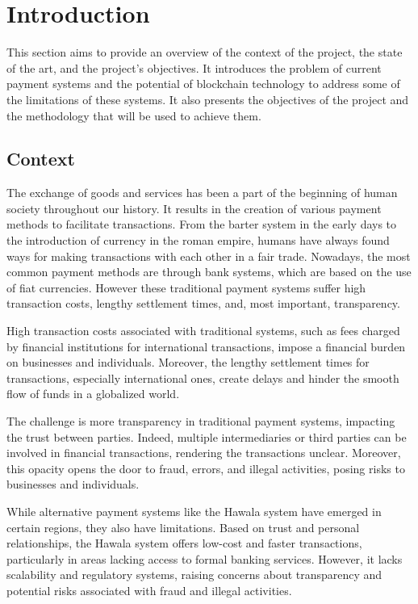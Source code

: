\chapter{Introduction}
\label{ch:introduction}

This section aims to provide an overview of the context of the project, the state of the art, and the project's objectives. It introduces the
problem of current payment systems and the potential of blockchain technology to address some of the limitations of these systems. It also presents the
objectives of the project and the methodology that will be used to achieve them.


\minitoc



\section{Context}
\label{sec:ch1_context}

The exchange of goods and services has been a part of the beginning of human society throughout our history. It results in the creation of various payment methods
to facilitate transactions. From the barter system in the early days to the introduction of currency in the roman empire, humans
have always found ways for making transactions with each other in a fair trade. 
Nowadays, the most common payment methods are through bank systems, which are based on the use of fiat currencies. However these traditional payment systems
suffer high transaction costs, lengthy settlement times, and, most important, transparency.

High transaction costs associated with traditional systems, such as fees charged by financial institutions for international transactions,
impose a financial burden on businesses and individuals. Moreover, the lengthy settlement times for
transactions, especially international ones, create delays and hinder the smooth flow of funds in a globalized world.

The challenge is more transparency in traditional payment systems, impacting the trust between parties. Indeed,
multiple intermediaries or third parties can be involved in financial transactions, rendering the transactions unclear. Moreover, this opacity opens
the door to fraud, errors, and illegal activities, posing risks to businesses and individuals.


While alternative payment systems like the Hawala system have emerged in certain regions, they also have limitations. Based on trust and personal relationships, the Hawala system offers low-cost and faster transactions, particularly in areas lacking access to formal banking services. However, it lacks scalability and regulatory systems, raising concerns about transparency and potential risks associated with fraud and illegal activities.


